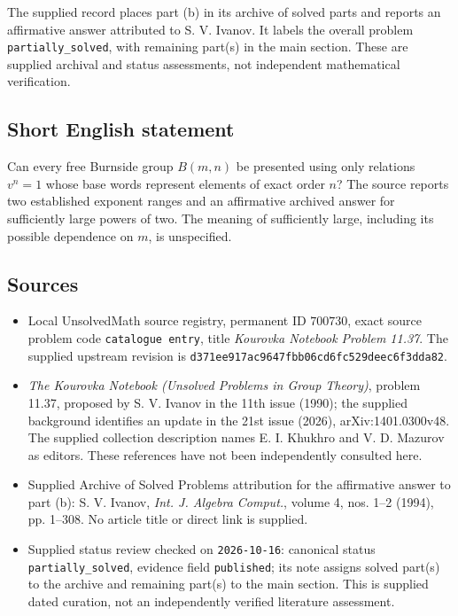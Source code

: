 \documentclass[11pt]{article}
\begin{document}
The supplied record places part (b) in its archive of solved parts and reports an affirmative answer attributed to S. V. Ivanov. It labels the overall problem \texttt{partially\_solved}, with remaining part(s) in the main section. These are supplied archival and status assessments, not independent mathematical verification.
\subsection{Short English statement}
Can every free Burnside group \(B(m,n)\) be presented using only relations \(v^n=1\) whose base words represent elements of exact order \(n\)? The source reports two established exponent ranges and an affirmative archived answer for sufficiently large powers of two. The meaning of sufficiently large, including its possible dependence on \(m\), is unspecified.
\subsection{Sources}
\begin{itemize}
\item Local UnsolvedMath source registry, permanent ID \(700730\), exact source problem code \texttt{catalogue entry}, title \emph{Kourovka Notebook Problem 11.37}. The supplied upstream revision is \texttt{d371ee917ac9647fbb06cd6fc529deec6f3dda82}.
\item \emph{The Kourovka Notebook (Unsolved Problems in Group Theory)}, problem 11.37, proposed by S. V. Ivanov in the 11th issue (1990); the supplied background identifies an update in the 21st issue (2026), arXiv:1401.0300v48. The supplied collection description names E. I. Khukhro and V. D. Mazurov as editors. These references have not been independently consulted here.
\item Supplied Archive of Solved Problems attribution for the affirmative answer to part (b): S. V. Ivanov, \emph{Int. J. Algebra Comput.}, volume 4, nos. 1--2 (1994), pp. 1--308. No article title or direct link is supplied.
\item Supplied status review checked on \texttt{2026-10-16}: canonical status \texttt{partially\_solved}, evidence field \texttt{published}; its note assigns solved part(s) to the archive and remaining part(s) to the main section. This is supplied dated curation, not an independently verified literature assessment.
\end{itemize}
\end{document}

